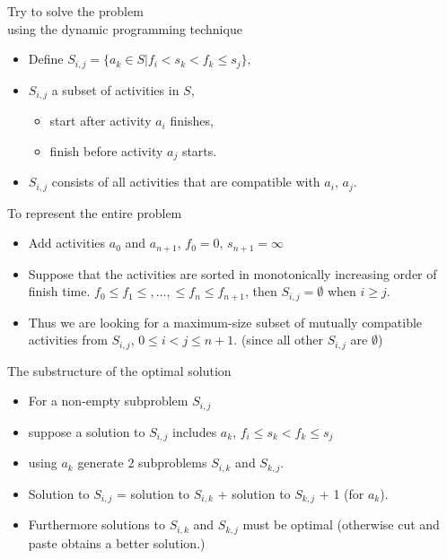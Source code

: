\documentclass{beamer}
\begin{document}
\begin{frame}{}
\begin{center}
{ \large Try to solve the problem} \\
{\large using the dynamic programming technique}
\end{center}
\begin{itemize}
\item Define $S_{i,j}=\{ a_k\in S | f_i<s_k<f_k\le s_j\},$
\item $S_{i,j}$ a subset of activities in $S$,
\begin{itemize}
\item start after activity $a_i$ finishes, 
\item finish before activity $a_j$ starts.
\end{itemize}
\item $S_{i,j}$ consists of all activities that are compatible with $a_i$, $a_j$.
\end{itemize}
\end{frame}

\begin{frame}{}
\begin{center}{\large To represent the entire problem}\end{center}
\begin{itemize}
\item Add activities $a_0$ and $a_{n+1}$, $f_0=0$, $s_{n+1}=\infty$
\item Suppose that the activities are sorted in monotonically increasing order of finish time.
$f_0\le f_1\le, \ldots, \le f_n\le f_{n+1}$,
 then $S_{i,j}=\emptyset$ when $i\ge j$. 
\item Thus we are looking for a maximum-size subset of mutually compatible activities from $S_{i,j}$,
$0\le i < j \le n+1.$ (since all other $S_{i,j}$ are $\emptyset$)
\end{itemize}
\end{frame}

\begin{frame}{}
\begin{center}
{\large The substructure of the optimal solution}
\end{center}
\begin{small}
\begin{itemize}
\item For a non-empty subproblem $S_{i,j}$ 
\item suppose a solution to $S_{i,j}$ includes $a_k$, $f_i\le s_k < f_k \le s_j$ 
\item using $a_k$ generate 2 subproblems $S_{i,k}$ and $S_{k,j}$. 
\item Solution to $S_{i,j}$ = solution to $S_{i,k}$ + solution to $S_{k,j}$ + 1 (for $a_k$). 
\item Furthermore solutions to $S_{i,k}$ and $S_{k,j}$ must be optimal (otherwise cut and paste
obtains a better solution.)
\end{itemize}
\end{small}
\end{frame}
\end{document}
